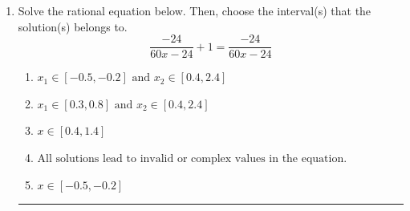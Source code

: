 \documentclass[14pt]{extbook}
\newcommand{\litem}[1]{\item#1\hspace*{-1cm}\rule{\textwidth}{0.4pt}}
\begin{document}
\begin{enumerate}
{\begin{enumerate}[label=\Alph*.]
\end{enumerate} }
\litem{
Solve the rational equation below. Then, choose the interval(s) that the solution(s) belongs to.\[ \frac{-24}{60x -24} + 1 = \frac{-24}{60x -24} \]\begin{enumerate}[label=\Alph*.]
\item \( x_1 \in [-0.5, -0.2] \text{ and } x_2 \in [0.4,2.4] \)
\item \( x_1 \in [0.3, 0.8] \text{ and } x_2 \in [0.4,2.4] \)
\item \( x \in [0.4,1.4] \)
\item \( \text{All solutions lead to invalid or complex values in the equation.} \)
\item \( x \in [-0.5,-0.2] \)

\end{enumerate} }
\end{enumerate}
\end{document}

